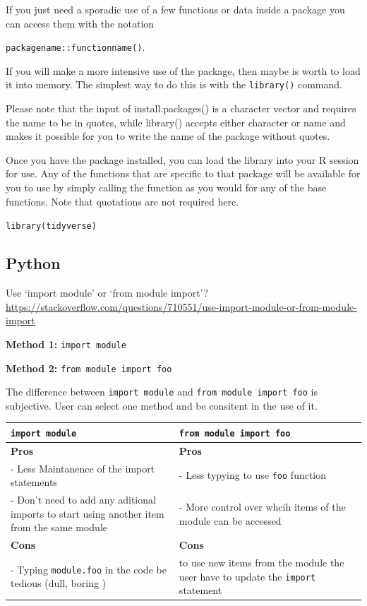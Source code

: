 \documentclass[
]{book}
\begin{document}
If you just need a sporadic use of a few functions or data inside a package you can access them with the notation

\texttt{packagename::functionname()}.

If you will make a more intensive use of the package, then maybe is worth to load it into memory. The simplest way to do this is with the \texttt{library()} command.

Please note that the input of install.packages() is a character vector and requires the name to be in quotes, while library() accepts either character or name and makes it possible for you to write the name of the package without quotes.

Once you have the package installed, you can load the library into your R session for use. Any of the functions that are specific to that package will be available for you to use by simply calling the function as you would for any of the base functions. Note that quotations are not required here.

\texttt{library(tidyverse)}

\hypertarget{python-4}{%
\subsection{Python}\label{python-4}}

Use `import module' or `from module import'? \url{https://stackoverflow.com/questions/710551/use-import-module-or-from-module-import}

\textbf{Method 1:} \texttt{import\ module}

\textbf{Method 2:} \texttt{from\ module\ import\ foo}

The difference between \texttt{import\ module} and \texttt{from\ module\ import\ foo} is subjective. User can select one method and be consitent in the use of it.

\begin{longtable}[]{@{}
  >{\raggedright\arraybackslash}p{}
  >{\raggedright\arraybackslash}p{}@{}}
\toprule
\texttt{import\ module} & \texttt{from\ module\ import\ foo} \\
\midrule
\endhead
\textbf{Pros} & \textbf{Pros} \\
- Less Maintanence of the import statements & - Less typying to use \texttt{foo} function \\
- Don't need to add any aditional imports to start using another item from the same module & - More control over whcih items of the module can be accessed \\
\textbf{Cons} & \textbf{Cons} \\
- Typing \texttt{module.foo} in the code be tedious (dull, boring ) & to use new items from the module the user have to update the \texttt{import} statement \\
\bottomrule
\end{longtable}
\end{document}
